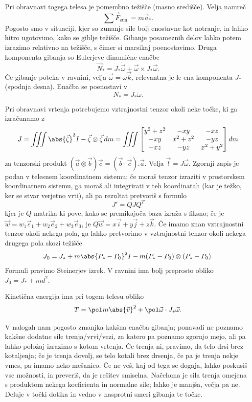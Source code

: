 
Pri obravnavi togega telesa je pomembno težišče (masno središče).
Velja namreč
\[
  \sum \vec{F}_{\text{zun.}} = m \vec{a}_*.
\]
Pogosto smo v situaciji, kjer so zunanje sile bolj enostavne kot notranje, in
lahko hitro ugotovimo, kako se giblje težišče.
Gibanje posameznih delov lahko potem izrazimo relativno na težišče, s čimer si
marsikaj poenostavimo.
Druga komponenta gibanja so Eulerjeve dinamične enačbe
\[
  \vec{N}_* = J_* \dot{\vec{\omega}} + \vec{\omega} \times J_* \vec{\omega}.
\]
Če gibanje poteka v ravnini, velja $\vec{\omega} = \omega \vec{k}$, relevantna
je le ena komponenta $J_*$ (spodnja desna).
Enačba se poenostavi v
\[
  N_* = J_* \dot{\omega}.
\]

Pri obravnavi vrtenja potrebujemo vztrajnostni tenzor okoli neke točke, ki ga
izračunamo z
\[
  J =
  \iiint \abs{\vec{\zeta}}^2 I - \vec{\zeta} \otimes \vec{\zeta}\,dm
  =
  \iiint
  \begin{bmatrix}
	y^2 + z^2 & -xy & -xz \\
	-xy & x^2 + z^2 & -yz \\
	-xz & -yz & x^2 + y^2
  \end{bmatrix}
  dm
\]
za tenzorski produkt $(\vec{a} \otimes \vec{b}) \vec{c} = (\vec{b} \cdot \vec{c})
. \vec{a}$.
Velja $\vec{l} = J \vec{\omega}$.
Zgornji zapis je podan v telesnem koordinatnem sistemu; če moraš tenzor izraziti
v prostorskem koordinatnem sistemu, ga moraš ali integrirati v teh koordinatah
(kar je težko, ker se stvar verjetno vrti), ali pa rezultat pretvoriš s formulo
\[
  J' = Q J Q^T
\]
kjer je $Q$ matrika ki pove, kako se premikajoča baza izraža s fiksno; če je
$\vec{w} = w_1 \vec{e}_1 + w_2 \vec{e}_2 + w_3 \vec{e}_3$, je $Q \vec{w} = x
\vec{i} + y \vec{j} + z \vec{k}$.
Če imamo znan vztrajnostni tenzor okoli nekega pola, ga lahko pretvorimo v
vztrajnostni tenzor okoli nekega drugega pola skozi težišče
\[
  J_0 = J_* + m \abs{P_* - P_0}^2 I - m (P_* - P_0) \otimes (P_* - P_0).
\]
Formuli pravimo Steinerjev izrek.
V ravnini ima bolj preprosto obliko $J_0 = J_* + m d^2$.

Kinetična energija ima pri togem telesu obliko
\[
  T = \pol m \abs{\vec{v}}^2 + \pol \vec{\omega} \cdot J_* \vec{\omega}.
\]

V nalogah nam pogosto zmanjka kakšna enačba gibanja; ponavadi ne poznamo
kakšne dodatne sile trenja/vrvi/vezi, za katero pa poznamo zgornjo mejo, ali pa
lahko položaj izrazimo s kotom vrtenja.
Če trenja ni, pravimo, da telo drsi brez kotaljenja; če je trenja dovolj, se
telo kotali brez drsenja, če pa je trenja nekje vmes, pa imamo neko mešanico.
Če ne veš, kaj od tega se dogaja, lahko poskusiš vse možnosti, in preveriš, da
je rešitev smiselna.
Načeloma je sila trenja omejena s produktom nekega koeficienta in normalne sile;
lahko je manjša, večja pa ne.
Deluje v točki dotika in vedno v nasprotni smeri gibanja te točke.


